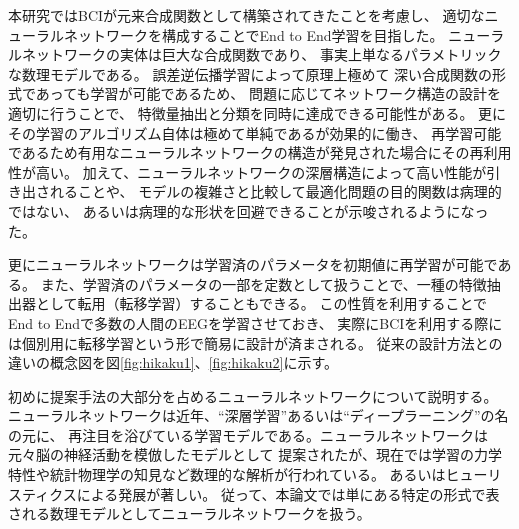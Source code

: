 本研究ではBCIが元来合成関数として構築されてきたことを考慮し、
適切なニューラルネットワークを構成することでEnd to End学習を目指した。
ニューラルネットワークの実体は巨大な合成関数であり、
事実上単なるパラメトリックな数理モデルである。
誤差逆伝播学習によって原理上極めて
深い合成関数の形式であっても学習が可能であるため、
問題に応じてネットワーク構造の設計を適切に行うことで、
特徴量抽出と分類を同時に達成できる可能性がある。
更にその学習のアルゴリズム自体は極めて単純であるが効果的に働き\cite{CheapLearning}、
再学習可能であるため有用なニューラルネットワークの構造が発見された場合にその再利用性が高い。
加えて、ニューラルネットワークの深層構造によって高い性能が引き出されること\cite{DeepvsShallow}や、
モデルの複雑さと比較して最適化問題の目的関数は病理的ではない、
あるいは病理的な形状を回避できることが示唆されるようになった\cite{ディープローカルミニマム}。

更にニューラルネットワークは学習済のパラメータを初期値に再学習が可能である。
また、学習済のパラメータの一部を定数として扱うことで、一種の特徴抽出器として転用（転移学習）することもできる。
この性質を利用することでEnd to Endで多数の人間のEEGを学習させておき、
実際にBCIを利用する際には個別用に転移学習という形で簡易に設計が済まされる。
従来の設計方法との違いの概念図を図\ref{fig:hikaku1}、\ref{fig:hikaku2}に示す。



初めに提案手法の大部分を占めるニューラルネットワークについて説明する。
ニューラルネットワークは近年、``深層学習''あるいは``ディープラーニング''の名の元に、
再注目を浴びている学習モデルである。ニューラルネットワークは元々脳の神経活動を模倣したモデルとして
提案されたが、現在では学習の力学特性や統計物理学の知見など数理的な解析が行われている\cite{ディープローカルミニマム,DeepvsShallow}。
あるいはヒューリスティクスによる発展が著しい。
従って、本論文では単にある特定の形式で表される数理モデルとしてニューラルネットワークを扱う。


